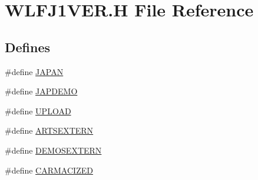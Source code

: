 \hypertarget{WLFJ1VER_8H}{
\section{WLFJ1VER.H File Reference}
\label{WLFJ1VER_8H}
}
\subsection*{Defines}
\begin{DoxyCompactItemize}
\item 
\#define \hyperlink{WLFJ1VER_8H_ade10b2b7da4d05be852a9fa90c7a1b2b}{JAPAN}
\item 
\#define \hyperlink{WLFJ1VER_8H_a7b1a542a362d171da4a3804e973f66b5}{JAPDEMO}
\item 
\#define \hyperlink{WLFJ1VER_8H_ae622bdcfd36d97e0d50a3e70150f53e0}{UPLOAD}
\item 
\#define \hyperlink{WLFJ1VER_8H_a36e8622d432bb1dcfc61ac233148b685}{ARTSEXTERN}
\item 
\#define \hyperlink{WLFJ1VER_8H_aa38bbec192ab8931f108d382f7833c31}{DEMOSEXTERN}
\item 
\#define \hyperlink{WLFJ1VER_8H_ab1d0a23b2e2640f4fbf73f30b3586f1b}{CARMACIZED}
\end{DoxyCompactItemize}


